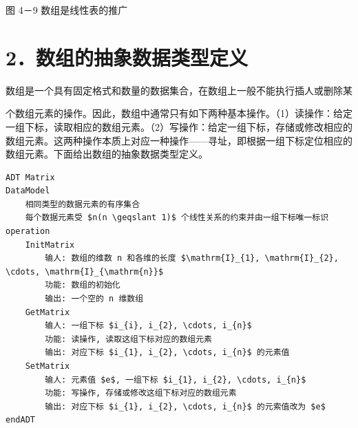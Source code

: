 \documentclass[10pt]{article}
\begin{document}
图 4－9 数组是线性表的推广

\section*{2．数组的抽象数据类型定义}
数组是一个具有固定格式和数量的数据集合，在数组上一般不能执行插人或删除某

个数组元素的操作。因此，数组中通常只有如下两种基本操作。（1）读操作：给定一组下标，读取相应的数组元素。（2）写操作：给定一组下标，存储或修改相应的数组元素。这两种操作本质上对应一种操作——寻址，即根据一组下标定位相应的数组元素。下面给出数组的抽象数据类型定义。

\begin{verbatim}
ADT Matrix
DataModel
    相同类型的数据元素的有序集合
    每个数据元素受 $n(n \geqslant 1)$ 个线性关系的约束并由一组下标唯一标识
operation
    InitMatrix
        输人: 数组的维数 n 和各维的长度 $\mathrm{I}_{1}, \mathrm{I}_{2}, \cdots, \mathrm{I}_{\mathrm{n}}$
        功能: 数组的初始化
        输出: 一个空的 n 维数组
    GetMatrix
        输人: 一组下标 $i_{i}, i_{2}, \cdots, i_{n}$
        功能: 读操作, 读取这组下标对应的数组元素
        输出: 对应下标 $i_{1}, i_{2}, \cdots, i_{n}$ 的元素值
    SetMatrix
        输人: 元素值 $e$, 一组下标 $i_{1}, i_{2}, \cdots, i_{n}$
        功能: 写操作, 存储或修改这组下标对应的数组元素
        输出: 对应下标 $i_{1}, i_{2}, \cdots, i_{n}$ 的元索值改为 $e$
endADT
\end{verbatim}
\end{document}
